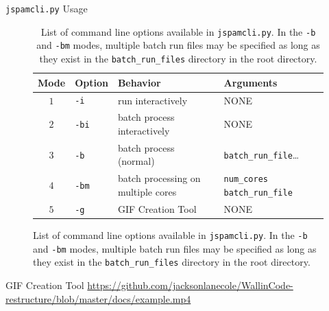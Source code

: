 \documentclass{beamer}
\begin{document}
\begin{frame}{\texttt{jspamcli.py} Usage}
    \centering
    \begin{figure}
\begin{table}[h!]
    \scriptsize
    \begin{tabular}{clll}
    \toprule
    Mode & Option       & Behavior                        & Arguments \\
    \midrule
    $1$ & \texttt{-i}  & run interactively               & NONE          \\
    $2$ & \texttt{-bi} & batch process interactively     & NONE          \\
    $3$ & \texttt{-b}  & batch process (normal)%
        & \texttt{batch\_run\_file}\ldots\\
    $4$ & \texttt{-bm} & batch processing on multiple cores & \texttt{num\_cores}
    \texttt{batch\_run\_file}\\
    $5$ & \texttt{-g}  & GIF Creation Tool               & NONE          \\
    \bottomrule
    \end{tabular}
    \caption[\texttt{jspamcli.py} command line options]%
    {List of command line options
        available in \texttt{jspamcli.py}. In the \texttt{-b} and \texttt{-bm}
        modes, multiple batch run files may be specified as long as they exist in
        the \texttt{batch\_run\_files} directory in the root directory.
    }
    \label{table:jspamcli_table}
\end{table}
\end{figure}
\end{frame}

\begin{frame}{GIF Creation Tool}
    \url{https://github.com/jacksonlanecole/WallinCode-restructure/blob/master/docs/example.mp4}
\end{frame}
\end{document}
